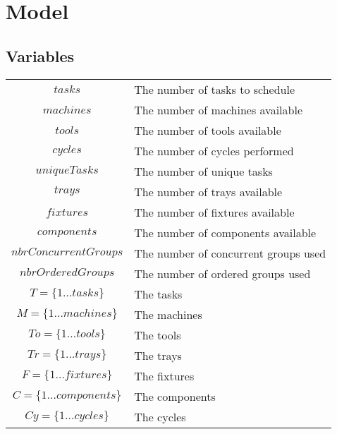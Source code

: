 \documentclass[10pt,a4paper]{report}
\begin{document}
\section*{Model}
\subsection*{Variables}
\renewcommand{\arraystretch}{2}
\begin{longtable}{c p{5cm}}
$tasks$ & The number of tasks to schedule \\

$machines$ & The number of machines available \\

$tools$ & The number of tools available \\

$cycles$ & The number of cycles performed \\

$uniqueTasks$ & The number of unique tasks \\

$trays$ & The number of trays available \\

$fixtures$ & The number of fixtures available \\

$components$ & The number of components available \\

$nbrConcurrentGroups$ & The number of concurrent groups used \\

$nbrOrderedGroups$ & The number of ordered groups used \\

$T = \{1 \ldots tasks\}$ & The tasks \\

$M = \{1 \ldots machines\}$ & The machines \\

$To = \{1 \ldots tools\}$ & The tools \\

$Tr = \{1 \ldots trays\}$ & The trays \\

$F = \{1 \ldots fixtures\}$ & The fixtures \\

$C = \{1 \ldots components\}$ & The components \\

$Cy = \{1 \ldots cycles\}$ & The cycles \\


\end{longtable}
\end{document}
